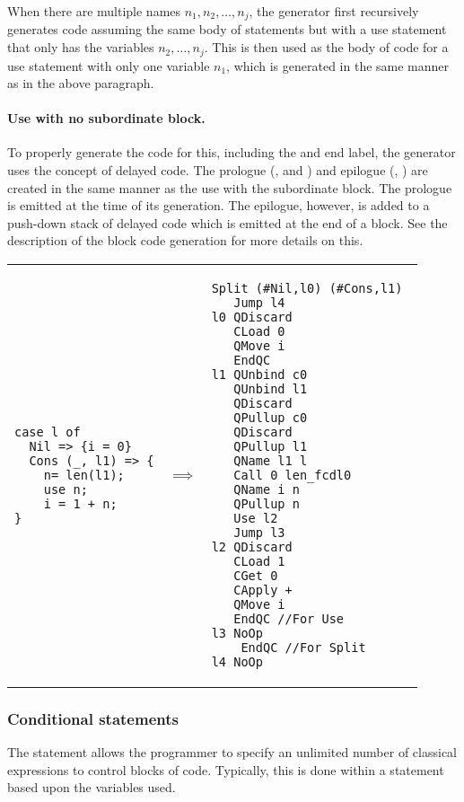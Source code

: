 When there are multiple names $n_1,n_2,\ldots,n_j$, the generator first
recursively generates code assuming the same body of 
statements but with a use statement that only has the variables 
$n_2,\ldots,n_j$. This is then used as the body of code for
a use statement with only one variable $n_1$, which is generated
in the same manner as in the above paragraph.

\paragraph{Use with no subordinate block.}
To properly generate the code for this, including the  and
end label, the generator uses
 the concept of delayed code. The prologue (,
 and ) and epilogue (, )
are created in the same manner as the use with the subordinate block.
The prologue is emitted at the time of its generation. The epilogue, however,
is added to a push-down stack of delayed code which is emitted at the
end of a block.  See the description of the block code generation for more
details on this.


\begin{center}
\begin{tabular}{p{2in}p{.3in}p{2.5in}}
{\begin{singlespace}
\begin{lstlisting}[style=linqpl]
case l of
  Nil => {i = 0}
  Cons (_, l1) => {
    n= len(l1);
    use n;
    i = 1 + n;
}
\end{lstlisting}
\end{singlespace}}
 & { \qquad \qquad \quad \quad \qquad \qquad $\implies$} &
{\begin{singlespace}
\begin{lstlisting}[style=linqpl]
 Split (#Nil,l0) (#Cons,l1) 
   Jump l4
l0 QDiscard
   CLoad 0
   QMove i
   EndQC
l1 QUnbind c0
   QUnbind l1
   QDiscard
   QPullup c0
   QDiscard 
   QPullup l1
   QName l1 l
   Call 0 len_fcdl0
   QName i n
   QPullup n
   Use l2
   Jump l3
l2 QDiscard 
   CLoad 1
   CGet 0
   CApply +
   QMove i
   EndQC //For Use
l3 NoOp
    EndQC //For Split
l4 NoOp
\end{lstlisting}
\end{singlespace}}
\end{tabular}
\end{center}



\subsubsection{Conditional statements}
The  statement allows the programmer to specify an
unlimited number of classical expressions to control blocks of code. Typically,
this is done within a  statement based upon the variables used.

